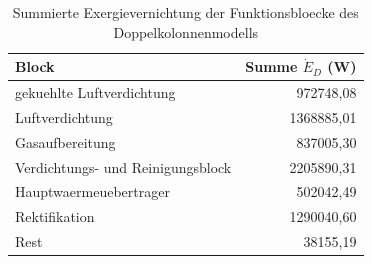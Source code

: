 \begin{longtable}{lr}
\caption{Summierte Exergievernichtung der Funktionsbloecke des Doppelkolonnenmodells} \\
\hline
Block & Summe $\dot{E}_D$ (W) \\
\hline
gekuehlte Luftverdichtung & 972748,08 \\
Luftverdichtung & 1368885,01 \\
Gasaufbereitung & 837005,30 \\
Verdichtungs- und Reinigungsblock & 2205890,31 \\
Hauptwaermeuebertrager & 502042,49 \\
Rektifikation & 1290040,60 \\
Rest & 38155,19 \\
\hline
\end{longtable}
